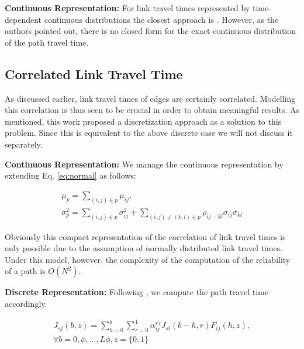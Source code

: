 \textbf{Continuous Representation: } For link travel times represented by
time-dependent continuous distributions the closest approach is
\cite{Bi-Yu13}. However, as the authors pointed out, there is no closed
form for the exact continuous distribution of the path travel time.


\subsection{Correlated Link Travel Time}
\label{subsec:cor}
As discussed earlier, link travel times of edges are certainly
correlated. Modelling this correlation is thus seen to be crucial in order to
obtain meaningful results. As mentioned, this work proposed a discretization
approach as a solution to this problem.
Since this is equivalent to the above discrete case we will not discuss it
separately.

\textbf{Continuous Representation: } We manage the continuous representation by
extending Eq. \ref{eq:normal} as follows:


\begin{gather}
\label{eq:normal2}
	\mu_{p} = \sum_{(i,j)\in p} \mu_{ij}, \\
	\sigma_{p}^2 = \sum_{(i,j)\in p} \sigma_{ij}^2 +\sum_{(i,j)\neq(k,l)\in p}
	\rho_{ij-kl}
	\sigma_{ij} \sigma_{kl}
\end{gather}

Obviously this compact representation of the correlation of link travel times is
only possible due to the assumption of normally distributed link travel times.
Under this model, however, the complexity of the computation of the reliability
of a path is $O(N^2)$.

\textbf{Discrete Representation: } Following \cite{Nie06}, we compute the
path travel time accordingly.

\begin{multline}
\label{eq:pmr3}
	J_{sj}(b,z) = \sum_{h=0}^b \sum_{r=0}^1 \alpha^{rz}_{ij} J_{si}(b-h,r)
	F_{ij}(h,z)  , \\ \forall b = 0, \phi,\ldots, L
	\phi, z = \{0, 1\}
\end{multline}

